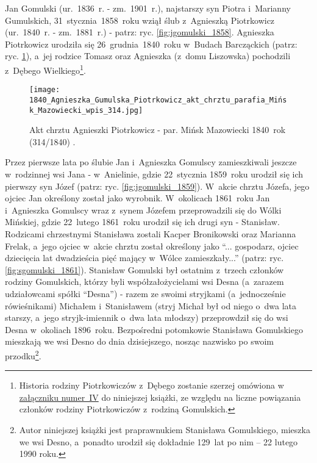 Jan Gomulski (ur.~1836~r. - zm.~1901~r.), najstarszy syn Piotra i~Marianny 
Gumulskich, 31~stycznia~1858~roku wziął ślub z~Agnieszką Piotrkowicz 
(ur.~1840~r. - zm.~1881~r.) - patrz: ryc. \ref{fig:jgomulski_1858}. Agnieszka
Piotrkowicz urodziła się 26~grudnia~1840~roku w~Budach Barcząckich (patrz:
ryc. \ref{fig:agumulska_1840}), a~jej rodzice Tomasz oraz Agnieszka (z~domu 
Liszowska) pochodzili z~Dębego Wielkiego\footnote{Historia rodziny
Piotrkowiczów z~Dębego zostanie szerzej omówiona w~\hyperref[sec:piotrkowicze]{
załączniku numer~IV} do niniejszej książki, ze względu na liczne powiązania
członków rodziny Piotrkowiczów z~rodziną Gomulskich.}.

\begin{figure}[!ht]
    \vspace*{0.5cm}
    \centering \texttt{[image: 
        1840\_Agnieszka\_Gumulska\_Piotrkowicz\_akt\_chrztu\_parafia\_Mińsk\_Mazowiecki\_wpis\_314.jpg]}
    \captionsetup{format=hang}
    \caption{Akt chrztu Agnieszki Piotrkowicz - par. Mińsk Mazowiecki 
    1840~rok (314/1840) 
    \cite{par_minsk2}.}
    \label{fig:agumulska_1840}
\end{figure}

Przez pierwsze lata po ślubie Jan i~Agnieszka Gomulscy zamieszkiwali jeszcze
w~rodzinnej wsi Jana - w~Anielinie, gdzie 22~stycznia 1859~roku urodził się
ich pierwszy syn Józef (patrz: ryc. \ref{fig:jgomulski_1859}). W~akcie chrztu
Józefa, jego ojciec Jan określony został jako wyrobnik. W~okolicach 1861~roku
Jan i~Agnieszka Gomulscy wraz z~synem Józefem przeprowadzili się do Wólki 
Mińskiej, gdzie 22~lutego 1861~roku urodził się ich drugi syn - Stanisław. 
Rodzicami chrzestnymi Stanisława zostali Kacper Bronikowski oraz Marianna
Frelak, a~jego ojciec w~akcie chrztu został określony jako \enquote{...
gospodarz, ojciec dziecięcia lat dwadzieścia pięć mający w~Wólce
zamieszkały...} (patrz: ryc. \ref{fig:sgomulski_1861}). Stanisław Gomulski był
ostatnim z~trzech członków rodziny Gomulskich, którzy byli współzałożycielami
wsi Desna (a~zarazem udziałowcami spółki \enquote{Desna}) - razem ze swoimi
stryjkami (a~jednocześnie rówieśnikami) Michałem i~Stanisławem (stryj Michał
był od niego o~dwa lata starszy, a~jego stryjk-imiennik o~dwa lata młodszy)
przeprowdził się do wsi Desna w~okoliach 1896~roku. Bezpośredni potomkowie
Stanisława Gomulskiego mieszkają we wsi Desno do dnia dzisiejszego, nosząc
nazwisko po swoim przodku\footnote{Autor niniejszej książki jest
praprawnukiem Stanisława Gomulskiego, mieszka we wsi Desno, a~ponadto urodził
się dokładnie 129~lat po nim – 22 lutego 1990 roku.}.

